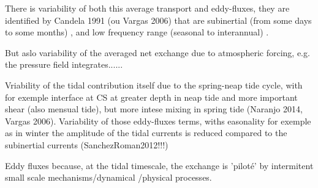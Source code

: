 There is variability of both this average transport and eddy-fluxes, they are identified by Candela 1991 (ou Vargas 2006) that are subinertial (from some days to some months) , and low frequency range (seasonal to interannual) .

But aslo variability of the averaged net exchange due to atmospheric forcing, e.g. the pressure field integrates......

Vriability of the tidal contribution itself due to the spring-neap tide cycle, with for exemple interface at CS at greater depth in neap tide and more important shear (also mensual tide), but more intese mixing in spring tide (Naranjo 2014, Vargas 2006). Variability of those eddy-fluxes terms, withs easonality for exemple as in winter the amplitude of the tidal currents is reduced compared to the subinertial currents (SanchezRoman2012!!!)






Eddy fluxes because, at the tidal timescale, the exchange is 'piloté' by intermitent small scale mechanisms/dynamical /physical processes.







